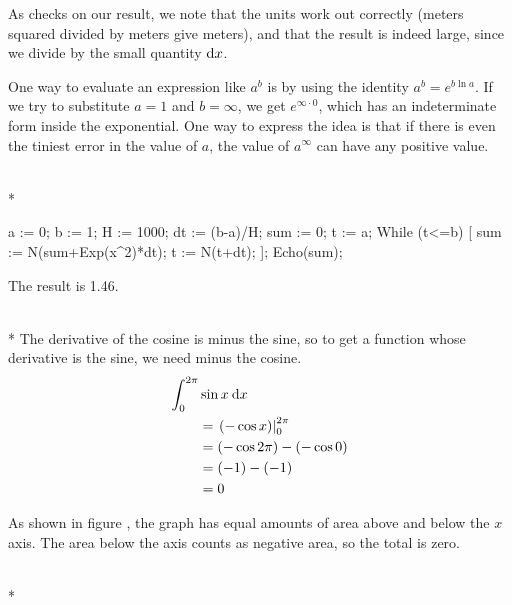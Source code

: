 As checks on our result, we note that the units work out correctly (meters squared divided by
meters give meters), and that the result is indeed large, since we divide by the small quantity $\textup{d} x$.

One way to evaluate an expression like $a^b$ is by using the identity
$a^b=e^{b\ln a}$. If we try to substitute $a=1$ and $b=\infty$,
we get $e^{\infty\cdot 0}$, which has an indeterminate form inside
the exponential. One way to express the idea is that
if there is even the tiniest error in the value of $a$, the value of $a^\infty$
can have any positive value.


\\*
\restartLineNumbers
\begin{Code}
  a := 0;
  b := 1;
  H := 1000;
  dt := (b-a)/H;
  sum := 0;
  t := a;
  While (t<=b) [
    sum := N(sum+Exp(x^2)*dt);
    t := N(t+dt);
  ];
  Echo(sum);
\end{Code}
The result is 1.46.


\\*
The derivative of the cosine is minus the sine, so to get a function whose
derivative is the sine, we need minus the cosine.
\begin{align*}
  \int_0^{2\pi} & \sin x \:\textup{d} x \\
    &= \left.(-\cos x)\right|_0^{2\pi} \\
    &= (-\cos 2\pi)-(-\cos 0) \\
    &= (-1)-(-1) \\
    &= 0
\end{align*}

As shown in  figure , the graph has equal amounts of area above and below the $x$ axis.
The area below the axis counts as negative area, so the total is zero.

\\*


